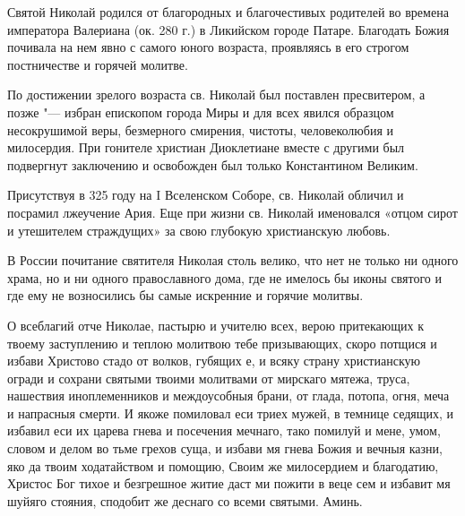 \mychapterending


\begin{mymulticols}


{\small Святой Николай родился от благородных и благочестивых родителей во времена императора Валериана (ок. 280 г.) в Ликийском городе Патаре. Благодать Божия почивала на нем явно с самого юного возраста, проявляясь в его строгом постничестве и горячей молитве.

По достижении зрелого возраста св. Николай был поставлен пресвитером, а позже "--- избран епископом города Миры и для всех явился образцом несокрушимой веры, безмерного смирения, чистоты, человеколюбия и милосердия. При гонителе христиан Диоклетиане вместе с другими был подвергнут заключению и освобожден был только Константином Великим.

Присутствуя в 325 году на I Вселенском Соборе, св. Николай обличил и посрамил лжеучение Ария. Еще при жизни св. Николай именовался «отцом сирот и утешителем страждущих» за свою глубокую христианскую любовь.

В России почитание святителя Николая столь велико, что нет не только ни одного храма, но и ни одного православного дома, где не имелось бы иконы святого и где ему не возносились бы самые искренние и горячие молитвы.

}



О всеблагий отче Николае, пастырю и учителю всех, верою притекающих к твоему заступлению и теплою молитвою тебе призывающих, скоро потщися и избави Христово стадо от волков, губящих е, и всяку страну христианскую огради и сохрани святыми твоими молитвами от мирскаго мятежа, труса, нашествия иноплеменников и междоусобныя брани, от глада, потопа, огня, меча и напрасныя смерти. И якоже помиловал еси триех мужей, в темнице седящих, и избавил еси их царева гнева и посечения мечнаго, тако помилуй и мене, умом, словом и делом во тьме грехов суща, и избави мя гнева Божия и вечныя казни, яко да твоим ходатайством и помощию, Своим же милосердием и благодатию, Христос Бог тихое и безгрешное житие даст ми пожити в веце сем и избавит мя шуйяго стояния, сподобит же деснаго со всеми святыми. Аминь.

\end{mymulticols}

\mychapterending{}


